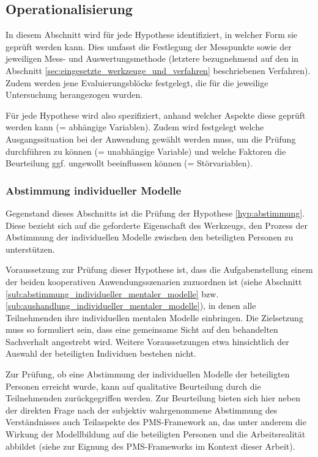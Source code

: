 \subsection{Operationalisierung} %
\label{sub:a_operationalisierung}

In diesem Abschnitt wird für jede Hypothese identifiziert, in welcher Form sie geprüft werden kann. Dies umfasst die Festlegung der Messpunkte sowie der jeweiligen Mess- und Auswertungsmethode (letztere bezugnehmend auf den in Abschnitt \ref{sec:eingesetzte_werkzeuge_und_verfahren} beschriebenen Verfahren). Zudem werden jene Evaluierungsblöcke festgelegt, die für die jeweilige Untersuchung herangezogen wurden.

Für jede Hypothese wird also spezifiziert, anhand welcher Aspekte diese geprüft werden kann (= abhängige Variablen). Zudem wird festgelegt welche Ausgangssituation bei der Anwendung gewählt werden muss, um die Prüfung durchführen zu können (= unabhängige Variable) und welche Faktoren die Beurteilung ggf. ungewollt beeinflussen können (= Störvariablen).

\subsubsection{Abstimmung individueller Modelle} %
\label{ssub:abstimmung_individueller_modelle}

Gegenstand dieses Abschnitts ist die Prüfung der Hypothese \ref{hyp:abstimmung}. Diese bezieht sich auf die geforderte Eigenschaft des Werkzeugs, den Prozess der Abstimmung der individuellen Modelle zwischen den beteiligten Personen zu unterstützen.

Voraussetzung zur Prüfung dieser Hypothese ist, dass die Aufgabenstellung einem der beiden kooperativen Anwendungsszenarien zuzuordnen ist (siehe Abschnitt \ref{sub:abstimmung_individueller_mentaler_modelle} bzw. \ref{sub:aushandlung_individueller_mentaler_modelle}), in denen alle Teilnehmenden ihre individuellen mentalen Modelle einbringen. Die Zielsetzung muss so formuliert sein, dass eine gemeinsame Sicht auf den behandelten Sachverhalt angestrebt wird. Weitere Voraussetzungen etwa hinsichtlich der Auswahl der beteiligten Individuen bestehen nicht.

Zur Prüfung, ob eine Abstimmung der individuellen Modelle der beteiligten Personen erreicht wurde, kann auf qualitative Beurteilung durch die Teilnehmenden zurückgegriffen werden. Zur Beurteilung bieten sich hier neben der direkten Frage nach der subjektiv wahrgenommene Abstimmung des Verständnisses auch Teilaspekte des \gls{PMS}-Framework \citep{Sedera02} an, das unter anderem die Wirkung der Modellbildung auf die beteiligten Personen und die Arbeitsrealität abbildet (siehe \citep{Wahlmuller10} zur Eignung des \gls{PMS}-Frameworks im Kontext dieser Arbeit).

